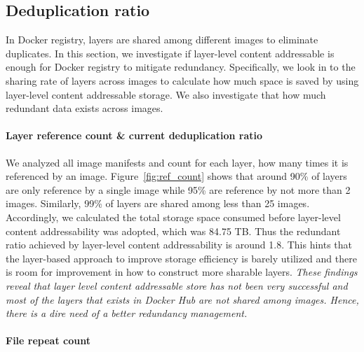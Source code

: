 \subsection{Deduplication ratio} 
\label{sec:dedup_ratio}


In Docker registry, layers are shared among different images to eliminate
duplicates.  
%
In this section, we investigate if layer-level content addressable
is enough for Docker registry to mitigate redundancy.  
%
Specifically, we look in
to the sharing rate of layers across images to calculate how much space is
saved by using layer-level content addressable storage.  
%
We also investigate
that how much redundant data exists across images.

\paragraph{Layer reference count \& current deduplication ratio}



We analyzed all image manifests and count for each layer, how many times it is
referenced by an image.
%
Figure~\ref{fig:ref_count} shows that around 90\% of layers are only reference
by a single image while 95\% are reference by not more than 2 images.
%
Similarly, 99\% of layers are shared among less than 25 images. 
%
Accordingly, we calculated the total storage space consumed before layer-level
content addressability was adopted, which was 84.75 TB.  Thus the redundant
ratio achieved by layer-level content addressability is around 1.8.
%
%
This hints that the layer-based approach to improve storage efficiency is
barely utilized and there is room for improvement in how to construct more
sharable layers.
%
\emph{These findings reveal that layer level content addressable store has not
been very successful and most of the layers that exists in Docker Hub are not
shared among images.
	Hence, there is a dire need of a better redundancy management.}

\paragraph{File repeat count}

